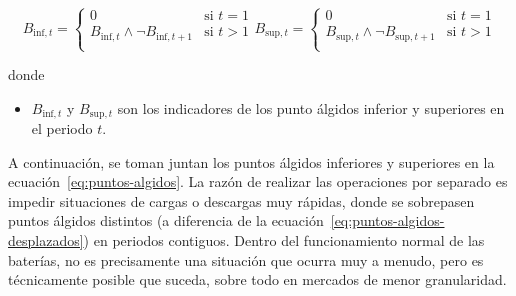 \begin{samepage}

  \begin{subequations}
    \label{eq:puntos-algidos-desplazados}

    \begin{equation}
      B_{\text{inf}, t} =
      \begin{cases}
        0                                                  & \text{si } t = 1 \\
        B_{\text{inf}, t} \land \neg B_{\text{inf}, t + 1} & \text{si } t > 1 \\
      \end{cases}
    \end{equation}

    \begin{equation}
      B_{\text{sup}, t} =
      \begin{cases}
        0                                                  & \text{si } t = 1 \\
        B_{\text{sup}, t} \land \neg B_{\text{sup}, t + 1} & \text{si } t > 1 \\
      \end{cases}
    \end{equation}

  \end{subequations}

  donde

  \begin{itemize}

    \item \( B_{\text{inf}, t} \) y \( B_{\text{sup}, t} \) son los indicadores de los punto álgidos inferior y superiores en el periodo \( t \).

  \end{itemize}

\end{samepage}

A continuación, se toman juntan los puntos álgidos inferiores y superiores en la ecuación~\ref{eq:puntos-algidos}. La razón de realizar las operaciones por separado es impedir situaciones de cargas o descargas muy rápidas, donde se sobrepasen puntos álgidos distintos (a diferencia de la ecuación~\ref{eq:puntos-algidos-desplazados}) en periodos contiguos. Dentro del funcionamiento normal de las baterías, no es precisamente una situación que ocurra muy a menudo, pero es técnicamente posible que suceda, sobre todo en mercados de menor granularidad.

